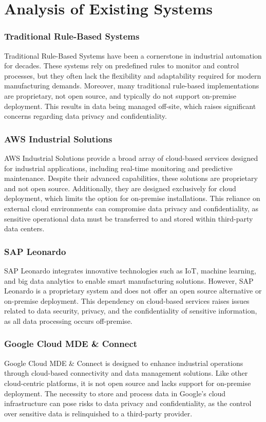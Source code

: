 \chapter{Analysis of Existing Systems}
\label{chap:existing_systems}
\setlength{\parskip}{1em}

\subsection{Traditional Rule-Based Systems}
Traditional Rule-Based Systems have been a cornerstone in industrial automation for decades. These systems rely on predefined rules to monitor and control processes, but they often lack the flexibility and adaptability required for modern manufacturing demands. Moreover, many traditional rule-based implementations are proprietary, not open source, and typically do not support on-premise deployment. This results in data being managed off-site, which raises significant concerns regarding data privacy and confidentiality.

\subsection{AWS Industrial Solutions}
AWS Industrial Solutions provide a broad array of cloud-based services designed for industrial applications, including real-time monitoring and predictive maintenance. Despite their advanced capabilities, these solutions are proprietary and not open source. Additionally, they are designed exclusively for cloud deployment, which limits the option for on-premise installations. This reliance on external cloud environments can compromise data privacy and confidentiality, as sensitive operational data must be transferred to and stored within third-party data centers.

\subsection{SAP Leonardo}
SAP Leonardo integrates innovative technologies such as IoT, machine learning, and big data analytics to enable smart manufacturing solutions. However, SAP Leonardo is a proprietary system and does not offer an open source alternative or on-premise deployment. This dependency on cloud-based services raises issues related to data security, privacy, and the confidentiality of sensitive information, as all data processing occurs off-premise.

\subsection{Google Cloud MDE \& Connect}
Google Cloud MDE \& Connect is designed to enhance industrial operations through cloud-based connectivity and data management solutions. Like other cloud-centric platforms, it is not open source and lacks support for on-premise deployment. The necessity to store and process data in Google’s cloud infrastructure can pose risks to data privacy and confidentiality, as the control over sensitive data is relinquished to a third-party provider.

